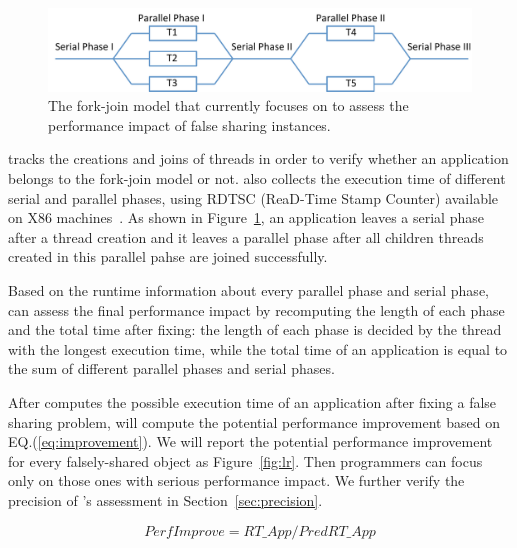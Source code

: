 \begin{figure}[ht!]
\begin{center}
\includegraphics[width=6in]{figure/forkjoin}
\end{center}
\caption{The fork-join model that \Cheetah{} currently focuses on to assess the performance impact of false sharing instances. }
\label{fig:forkjoinmodel}
\end{figure}

\cheetah{} tracks the creations and joins of threads in order to verify whether an application belongs to the fork-join model or not. \Cheetah{} also collects the execution time of different serial and parallel phases, using RDTSC (ReaD-Time Stamp Counter) available on X86 machines~\cite{rtdsc}. As shown in Figure~\ref{fig:forkjoinmodel}, an application leaves a serial phase after a thread creation and it leaves a parallel phase after all children threads created in this parallel pahse are joined successfully. 

Based on the runtime information about every parallel phase and serial phase, \cheetah{} can assess the final performance impact by recomputing the length of each phase and the total time after fixing: the length of each phase is decided by the thread with the longest execution time, while the total time of an application is equal to the sum of different parallel phases and serial phases. 

After \cheetah{} computes the possible execution time of an application after fixing a false sharing problem, \cheetah{} will compute the potential performance improvement based on EQ.(\ref{eq:improvement}). We will report the potential performance improvement for every falsely-shared object as Figure~\ref{fig:lr}. Then programmers can focus only on those ones with serious performance impact. We further verify the precision of \cheetah{}'s assessment in Section~\ref{sec:precision}.

\begin{equation}
\label{eq:improvement}
PerfImprove = RT\_{App} / PredRT\_{App}
\end{equation}

